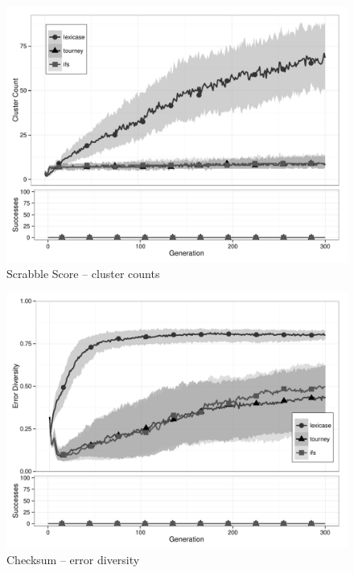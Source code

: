 \begin{figure}[p] %
\centering
\includegraphics[width=11.5cm]{scrabble-score-cluster.pdf}
\caption{Scrabble Score -- cluster counts}
\label{scrabble-scoreClu}
\end{figure}

\begin{figure}[p] %
\centering
\includegraphics[width=11.5cm]{checksum-diversity.pdf}
\caption{Checksum -- error diversity}
\label{checksumDiv}
\end{figure}


